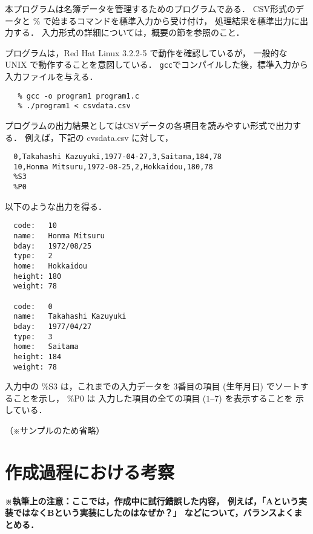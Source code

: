 \documentclass[a4j,11pt]{jarticle}
\begin{document}
本プログラムは名簿データを管理するためのプログラムである．
CSV形式のデータと \% で始まるコマンドを標準入力から受け付け，
処理結果を標準出力に出力する．
入力形式の詳細については，概要の節を参照のこと．

プログラムは，Red Hat Linux 3.2.2-5 で動作を確認しているが，
一般的な UNIX で動作することを意図している．
\verb|gcc|でコンパイルした後，標準入力から入力ファイルを与える．

{\fontsize{10pt}{11pt} \selectfont
 \begin{verbatim}
   % gcc -o program1 program1.c
   % ./program1 < csvdata.csv
 \end{verbatim}
}

プログラムの出力結果としてはCSVデータの各項目を読みやすい形式で出力する．
例えば，下記の cvsdata.csv に対して，

{\fontsize{10pt}{11pt} \selectfont
 \begin{verbatim}
  0,Takahashi Kazuyuki,1977-04-27,3,Saitama,184,78
  10,Honma Mitsuru,1972-08-25,2,Hokkaidou,180,78
  %S3
  %P0
 \end{verbatim}
}

\noindent %
以下のような出力を得る．

{\fontsize{10pt}{11pt} \selectfont
 \begin{verbatim}
  code:   10
  name:   Honma Mitsuru
  bday:   1972/08/25
  type:   2
  home:   Hokkaidou
  height: 180
  weight: 78

  code:   0
  name:   Takahashi Kazuyuki
  bday:   1977/04/27
  type:   3
  home:   Saitama
  height: 184
  weight: 78
 \end{verbatim}
}

\noindent
入力中の
\%S3 は，これまでの入力データを
3番目の項目 (生年月日) でソートすることを示し，
\%P0 は 入力した項目の全ての項目 ($1$--$7$) を表示することを
示している．

（※サンプルのため省略）

\section{作成過程における考察}

\textbf{\small ※執筆上の注意：ここでは，作成中に試行錯誤した内容，
    例えば，「Aという実装ではなくBという実装にしたのはなぜか？」
    などについて，バランスよくまとめる．\\}
\end{document}
